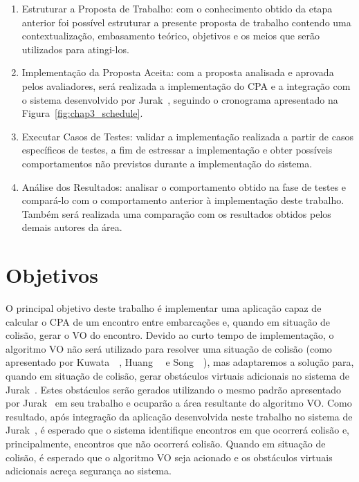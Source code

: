 \begin{enumerate}[label=\alph*)]
            \item Estruturar a Proposta de Trabalho: com o conhecimento obtido da etapa anterior foi possível estruturar a presente proposta de trabalho contendo uma contextualização, embasamento teórico, objetivos e os meios que serão utilizados para atingi-los.
            
            \item Implementação da Proposta Aceita: com a proposta analisada e aprovada pelos avaliadores, será realizada a implementação do CPA e a integração com o sistema desenvolvido por Jurak~\cite{JURAK2020}, seguindo o cronograma apresentado na Figura~\ref{fig:chap3_schedule}.
            
            \item Executar Casos de Testes: validar a implementação realizada a partir de casos específicos de testes, a fim de estressar a implementação e obter possíveis comportamentos não previstos durante a implementação do sistema.
            
            \item Análise dos Resultados: analisar o comportamento obtido na fase de testes e compará-lo com o comportamento anterior à implementação deste trabalho. Também será realizada uma comparação com os resultados obtidos pelos demais autores da área. 
        \end{enumerate}
        
    \section{Objetivos}
    
        O principal objetivo deste trabalho é implementar uma aplicação capaz de calcular o CPA de um encontro entre embarcações e, quando em situação de colisão, gerar o VO do encontro. Devido ao curto tempo de implementação, o algoritmo VO não será utilizado para resolver uma situação de colisão (como apresentado por Kuwata~\etal~\cite{KUWATA2014110}, Huang~\etal~\cite{HUANG2019142} e Song~\etal~\cite{SONG2018351}), mas adaptaremos a solução para, quando em situação de colisão, gerar obstáculos virtuais adicionais no sistema de Jurak~\cite{JURAK2020}. Estes obstáculos serão gerados utilizando o mesmo padrão apresentado por Jurak~\cite{JURAK2020} em seu trabalho e ocuparão a área resultante do algoritmo VO. Como resultado, após integração da aplicação desenvolvida neste trabalho no sistema de Jurak~\cite{JURAK2020}, é esperado que o sistema identifique encontros em que ocorrerá colisão e, principalmente, encontros que não ocorrerá colisão. Quando em situação de colisão, é esperado que o algoritmo VO seja acionado e os obstáculos virtuais adicionais acreça segurança ao sistema.
        
